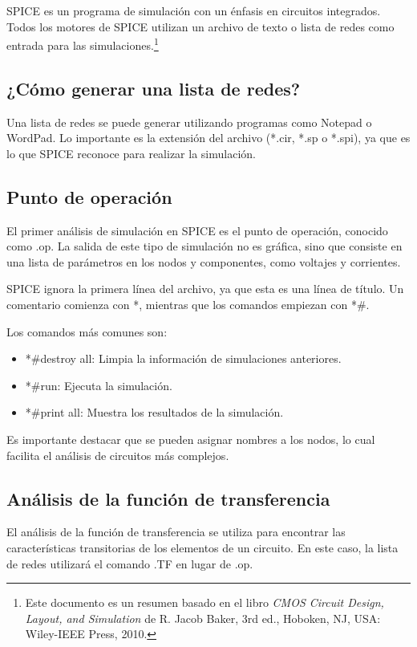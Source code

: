 \documentclass{article}
\begin{document}
	\maketitle
	
	SPICE es un programa de simulación con un énfasis en circuitos integrados. Todos los motores de SPICE utilizan un archivo de texto o lista de redes como entrada para las simulaciones.\footnote{Este documento es un resumen basado en el libro \textit{CMOS Circuit Design, Layout, and Simulation} de R. Jacob Baker, 3rd ed., Hoboken, NJ, USA: Wiley-IEEE Press, 2010.}
	
	\subsection*{¿Cómo generar una lista de redes?}
	Una lista de redes se puede generar utilizando programas como Notepad o WordPad. Lo importante es la extensión del archivo (*.cir, *.sp o *.spi), ya que es lo que SPICE reconoce para realizar la simulación.
	
	\subsection*{Punto de operación}
	El primer análisis de simulación en SPICE es el punto de operación, conocido como .op. La salida de este tipo de simulación no es gráfica, sino que consiste en una lista de parámetros en los nodos y componentes, como voltajes y corrientes.
	
	SPICE ignora la primera línea del archivo, ya que esta es una línea de título. Un comentario comienza con *, mientras que los comandos empiezan con *\#.
	
	Los comandos más comunes son:
	\begin{itemize}
		\item *\#destroy all: Limpia la información de simulaciones anteriores.
		\item *\#run: Ejecuta la simulación.
		\item *\#print all: Muestra los resultados de la simulación.
	\end{itemize}
	
	Es importante destacar que se pueden asignar nombres a los nodos, lo cual facilita el análisis de circuitos más complejos.
	
	\subsection*{Análisis de la función de transferencia}
	El análisis de la función de transferencia se utiliza para encontrar las características transitorias de los elementos de un circuito. En este caso, la lista de redes utilizará el comando .TF en lugar de .op.
	
\end{document}
